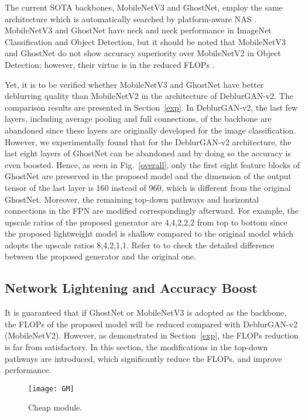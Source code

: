 \documentclass[letterpaper, 10 pt, conference]{ieeeconf}
\begin{document}
The current SOTA backbones,  MobileNetV3 and GhostNet, employ the same architecture which is automatically searched by platform-aware NAS  \cite{mobilenetv3,ghostnet}. MobileNetV3 and GhostNet have neck and neck performance in ImageNet Classification and Object Detection, but it should be noted that MobileNetV3 and GhostNet do not show accuracy superiority over MobileNetV2 in Object Detection; however, their virtue is in the reduced FLOPs \cite{ghostnet}.

Yet, it is to be verified whether MobileNetV3 and GhostNet have better deblurring quality than MobileNetV2 in the architecture of DeblurGAN-v2. The comparison results are presented in Section~\ref{exp}. In DeblurGAN-v2, the last few layers, including average pooling and full connections, of the backbone are abandoned since these layers are originally developed for the image classification. However, we experimentally found that for the DeblurGAN-v2 architecture, the last eight layers of GhostNet can be abandoned and by doing so the accuracy is even boosted. Hence, as seen in Fig.~\ref{overall}, only the first eight feature blocks of GhostNet are preserved in the proposed model and the dimension of the output tensor of the last layer is 160 instead of 960, which is different from the original GhostNet. Moreover, the remaining top-down pathways and horizontal connections in the FPN are modified correspondingly afterward. For example, the upscale ratios of the proposed generator are 4,4,2,2,2 from top to bottom since the proposed lightweight model is shallow compared to the original model which adopts the upscale ratios 8,4,2,1,1. Refer to \cite{deblurgan2} to check the detailed difference between the proposed generator and the original one.


\subsection{Network Lightening and Accuracy Boost \label{light}}
It is guaranteed that if GhostNet or MobileNetV3 is adopted as the backbone, the FLOPs of the proposed model will be reduced compared with DeblurGAN-v2 (MobileNetV2). However, as demonstrated in Section~\ref{exp}, the FLOPs reduction is far from  satisfactory. In this section, the modifications in the top-down pathways are introduced, which significantly reduce the FLOPs, and improve performance. 
\begin{figure}[thb]
	\centering
	\texttt{[image: GM]}
    	\caption{Cheap module.}
	\label{GM}
\end{figure}
\end{document}

